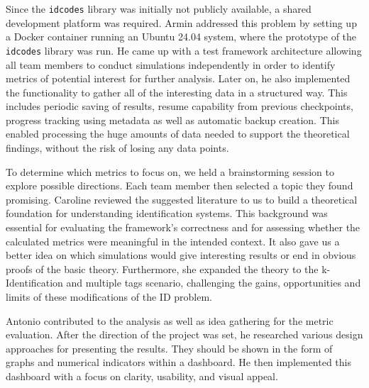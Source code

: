 \documentclass[english,BCOR=4mm,cdfont=false]{tudscrreprt} %
\begin{document}
Since the \texttt{idcodes} library was initially not publicly available, a shared development platform was required. Armin addressed this problem by setting up a Docker container running an Ubuntu 24.04 system, where the prototype of the \texttt{idcodes} library was run. He came up with a test framework architecture allowing all team members to conduct simulations independently in order to identify metrics of potential interest for further analysis. Later on, he also implemented the functionality to gather all of the interesting data in a structured way. This includes periodic saving of results, resume capability from previous checkpoints, progress tracking using metadata as well as automatic backup creation. This enabled processing the huge amounts of data needed to support the theoretical findings, without the risk of losing any data points.

To determine which metrics to focus on, we held a brainstorming session to explore possible directions. Each team member then selected a topic they found promising. Caroline reviewed the suggested literature to us to build a theoretical foundation for understanding identification systems. This background was essential for evaluating the framework's correctness and for assessing whether the calculated metrics were meaningful in the intended context. It also gave us a better idea on which simulations would give interesting results or end in obvious proofs of the basic theory. Furthermore, she expanded the theory to the k-Identification and multiple tags scenario, challenging the gains, opportunities and limits of these modifications of the ID problem.

Antonio contributed to the analysis as well as idea gathering for the metric evaluation. After the direction of the project was set, he researched various design approaches for presenting the results. They should be shown in the form of graphs and numerical indicators within a dashboard. He then implemented this dashboard with a focus on clarity, usability, and visual appeal.
\end{document}
